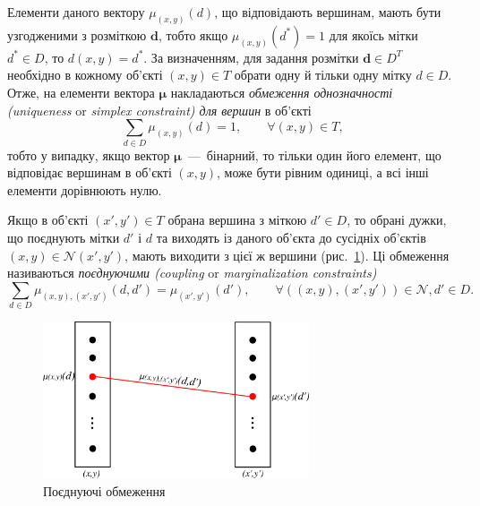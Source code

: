 Елементи даного вектору $\mu_{\left(x, y \right)} \left(d \right)$,
що відповідають вершинам, мають бути узгодженими з розміткою $\pmb{d}$,
тобто якщо $\mu_{\left(x, y \right)} \left(d^* \right) = 1$ для якоїсь мітки
$d^* \in D$,
то $d \left(x, y \right) = d^*$.
За визначенням, для задання розмітки $\pmb{d} \in D^T$
необхідно в кожному об'єкті $\left(x, y \right) \in T$
обрати одну й тільки одну мітку $d \in D$.
Отже, на елементи вектора $\pmb{\mu}$ накладаються
\textit{обмеження однозначності (uniqueness} or
\textit{simplex constraint) для вершин} в об'єкті
\begin{equation} \label{eq:vetrex:unambiguity}
    \sum \limits_{d \in D} \mu_{\left( x, y \right)} \left( d \right) = 1,
    \qquad \forall \left(x, y \right) \in T,
\end{equation}
тобто у випадку, якщо вектор $\pmb{\mu}$~---~бінарний,
то тільки один його елемент,
що відповідає вершинам в об'єкті $\left(x, y \right)$, може бути рівним одиниці,
а всі інші елементи дорівнюють нулю.

Якщо в об'єкті $\left(x', y' \right) \in T$ обрана вершина з міткою $d' \in D$,
то обрані дужки, що поєднують мітки $d'$ і $d$
та виходять із даного об'єкта до сусідніх об'єктів
$\left(x, y \right) \in \mathcal{N} \left(x', y' \right)$,
мають виходити з цієї ж вершини (рис.~\ref{fig:combining:constraints}).
Ці обмеження називаються
\textit{поєднуючими (coupling} or \textit{marginalization constraints)}
\begin{equation} \label{eq:combining:constraints}
    \sum \limits_{d \in D}
        \mu_{\left(x, y \right), \left(x', y' \right)} \left(d, d' \right) =
        \mu_{\left(x', y' \right)} \left(d' \right), \qquad
    \forall
    \left( \left(x, y \right), \left(x',y' \right) \right) \in \mathcal{N},
    d' \in D.
\end{equation}

\begin{figure}[h]
  \centering
  \includegraphics[width=0.7\textwidth]{images/combining_constraints}
  \caption{Поєднуючі обмеження}
  \label{fig:combining:constraints}
\end{figure}

